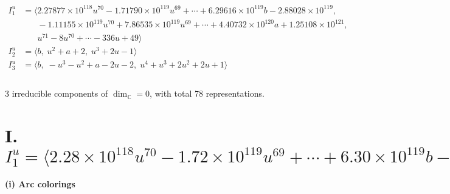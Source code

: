 \documentclass[1p]{elsarticle_modified}
\theoremstyle{definition}
\begin{document}
\begin{align*}
I^u_{1}&=\langle 
2.27877\times10^{118} u^{70}-1.71790\times10^{119} u^{69}+\cdots+6.29616\times10^{119} b-2.88028\times10^{119},\\
\phantom{I^u_{1}}&\phantom{= \langle  }-1.11155\times10^{119} u^{70}+7.86535\times10^{119} u^{69}+\cdots+4.40732\times10^{120} a+1.25108\times10^{121},\\
\phantom{I^u_{1}}&\phantom{= \langle  }u^{71}-8 u^{70}+\cdots-336 u+49\rangle \\
I^u_{2}&=\langle 
b,\;u^2+a+2,\;u^3+2 u-1\rangle \\
I^u_{3}&=\langle 
b,\;- u^3- u^2+a-2 u-2,\;u^4+u^3+2 u^2+2 u+1\rangle \\
\\
\end{align*}
\raggedright * 3 irreducible components of $\dim_{\mathbb{C}}=0$, with total 78 representations.\\
\newpage
\renewcommand{\arraystretch}{1}
\centering \section*{I. $I^u_{1}= \langle 2.28\times10^{118} u^{70}-1.72\times10^{119} u^{69}+\cdots+6.30\times10^{119} b-2.88\times10^{119},\;-1.11\times10^{119} u^{70}+7.87\times10^{119} u^{69}+\cdots+4.41\times10^{120} a+1.25\times10^{121},\;u^{71}-8 u^{70}+\cdots-336 u+49 \rangle$}
\flushleft \textbf{(i) Arc colorings}\\
\end{document}
